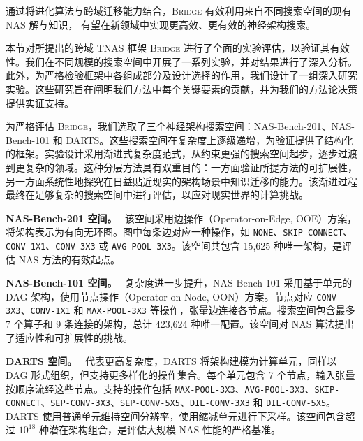\documentclass[../main.tex]{subfiles}
\begin{document}
通过将进化算法与跨域迁移能力结合，\textsc{Bridge} 有效利用来自不同搜索空间的现有 NAS 解与知识，
有望在新领域中实现更高效、更有效的神经架构搜索。

\label{sec:ch4-experiment}

本节对所提出的跨域 TNAS 框架 \textsc{Bridge} 进行了全面的实验评估，以验证其有效性。我们在不同规模的搜索空间中开展了一系列实验，并对结果进行了深入分析。此外，为严格检验框架中各组成部分及设计选择的作用，我们设计了一组深入研究实验。这些研究旨在阐明我们方法中每个关键要素的贡献，并为我们的方法论决策提供实证支持。


为严格评估 \textsc{Bridge}，我们选取了三个神经架构搜索空间：NAS-Bench-201、NAS-Bench-101 和 DARTS。这些搜索空间在复杂度上逐级递增，为验证提供了结构化的框架。实验设计采用渐进式复杂度范式，从约束更强的搜索空间起步，逐步过渡到更复杂的领域。这种分层方法具有双重目的：一方面验证所提方法的可扩展性，另一方面系统性地探究在日益贴近现实的架构场景中知识迁移的能力。该渐进过程最终在足够复杂的搜索空间中进行评估，以应对现实世界的计算挑战。

\textbf{NAS-Bench-201 空间。}~\cite{DBLP:journals/pami/DongLMG22}
该空间采用边操作（Operator-on-Edge, OOE）方案，将架构表示为有向无环图。图中每条边对应一种操作，如 \texttt{NONE}、\texttt{SKIP-CONNECT}、\texttt{CONV-1X1}、\texttt{CONV-3X3} 或 \texttt{AVG-POOL-3X3}。该空间共包含 15,625 种唯一架构，是评估 NAS 方法的有效起点。

\textbf{NAS-Bench-101 空间。}~\cite{DBLP:conf/icml/YingKCR0H19}
复杂度进一步提升，NAS-Bench-101 采用基于单元的 DAG 架构，使用节点操作（Operator-on-Node, OON）方案。节点对应 \texttt{CONV-3X3}、\texttt{CONV-1X1} 和 \texttt{MAX-POOL-3X3} 等操作，张量边连接各节点。搜索空间包含最多 7 个算子和 9 条连接的架构，总计 423,624 种唯一配置。该空间对 NAS 算法提出了适应性和可扩展性的挑战。

\textbf{DARTS 空间。}~\cite{DBLP:conf/iclr/LiuSY19}
代表更高复杂度，DARTS 将架构建模为计算单元，同样以 DAG 形式组织，但支持更多样化的操作集合。每个单元包含 7 个节点，输入张量按顺序流经这些节点。支持的操作包括 \texttt{MAX-POOL-3X3}、\texttt{AVG-POOL-3X3}、\texttt{SKIP-CONNECT}、\texttt{SEP-CONV-3X3}、\texttt{SEP-CONV-5X5}、\texttt{DIL-CONV-3X3} 和 \texttt{DIL-CONV-5X5}。DARTS 使用普通单元维持空间分辨率，使用缩减单元进行下采样。该空间包含超过 $10^{18}$ 种潜在架构组合，是评估大规模 NAS 性能的严格基准。
\end{document}
